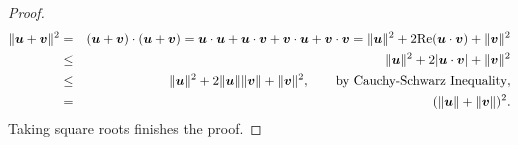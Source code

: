 \begin{proof}
\begin{eqnarray*}
\Vert \boldsymbol u + \boldsymbol v\Vert^2 &=& (\boldsymbol u + \boldsymbol v)\cdot (\boldsymbol u + \boldsymbol v) = \boldsymbol u\cdot \boldsymbol u + \boldsymbol u\cdot \boldsymbol v + \boldsymbol v\cdot \boldsymbol u + \boldsymbol v\cdot \boldsymbol v = \Vert\boldsymbol u\Vert^2 + 2\text{Re}(\boldsymbol u\cdot \boldsymbol v) + \Vert \boldsymbol v\Vert^2\\
&\le& \Vert\boldsymbol u\Vert^2 + 2|\boldsymbol u\cdot \boldsymbol v| + \Vert \boldsymbol v\Vert^2\\
&\le& \Vert\boldsymbol u\Vert^2 + 2\Vert\boldsymbol u\Vert\Vert \boldsymbol v\Vert + \Vert \boldsymbol v\Vert^2, \qquad \text{by Cauchy-Schwarz Inequality},\\
&=& (\Vert \boldsymbol u\Vert + \Vert \boldsymbol v\Vert)^2.
\end{eqnarray*} Taking square roots finishes the proof.
\end{proof}

